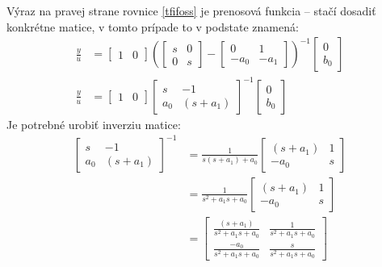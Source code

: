 \documentclass[a4paper, 10pt, ]{article}
\begin{document}
Výraz na pravej strane rovnice \eqref{tfifoss} je prenosová funkcia -- stačí dosadiť konkrétne matice, v tomto prípade to v podstate znamená:
\begin{subequations}
    \begin{align}
        \frac{y}{u} &=
        \begin{bmatrix} 1 & 0 \end{bmatrix}
        \left(
            \begin{bmatrix} s & 0 \\ 0 & s \end{bmatrix} - \begin{bmatrix} 0 & 1 \\ -a_0 & -a_1 \end{bmatrix}
        \right)^{-1}
        \begin{bmatrix} 0 \\ b_0 \end{bmatrix}
        \\
        \frac{y}{u} &=
        \begin{bmatrix} 1 & 0 \end{bmatrix}
            \begin{bmatrix} s & -1 \\ a_0 & (s+a_1) \end{bmatrix} ^{-1}
        \begin{bmatrix} 0 \\ b_0 \end{bmatrix}
    \end{align}
\end{subequations}
Je potrebné urobiť inverziu matice:
\begin{subequations}
    \begin{align}
            \begin{bmatrix} s & -1 \\ a_0 & (s+a_1) \end{bmatrix} ^{-1}
            &=
            \frac{1}{s \left(s + a_1\right) + a_0}
            \begin{bmatrix} (s+a_1) & 1 \\ -a_0 & s \end{bmatrix} \\
            &=
            \frac{1}{s^2 + a_1 s + a_0}
            \begin{bmatrix} (s+a_1) & 1 \\ -a_0 & s \end{bmatrix} \\
            &=
            \begin{bmatrix} \displaystyle \frac{(s+a_1)}{s^2 + a_1 s + a_0} & \displaystyle \frac{1}{s^2 + a_1 s + a_0} \\ \displaystyle \frac{-a_0}{s^2 + a_1 s + a_0} & \displaystyle \frac{s}{s^2 + a_1 s + a_0} \end{bmatrix}
    \end{align}
\end{subequations}
\end{document}
